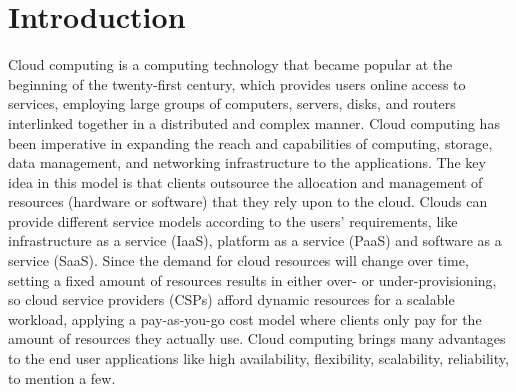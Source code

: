 \section{Introduction}\label{sec:Introduction}
\noindent
Cloud computing is a computing technology that became popular at the beginning of the twenty-first century, which provides users online access to services, employing large groups of computers, servers, disks, and routers interlinked together in a distributed and complex manner. Cloud computing has been imperative in expanding the reach and capabilities of computing, storage, data management, and networking infrastructure to the applications. The key idea in this model is that clients outsource the allocation and management of resources (hardware or software) that they rely upon to the cloud. Clouds can provide different service models according to the users' requirements, like infrastructure as a service (IaaS), platform as a service (PaaS) and software as a service (SaaS). Since the demand for cloud resources will change over time, setting a fixed amount of resources results in either over- or under-provisioning, so cloud service providers (CSPs) afford dynamic resources for a scalable workload, applying a pay-as-you-go cost model where clients only pay for the amount of resources they actually use. Cloud computing brings many advantages to the end user applications like high availability, flexibility, scalability, reliability, to mention a few.\\
